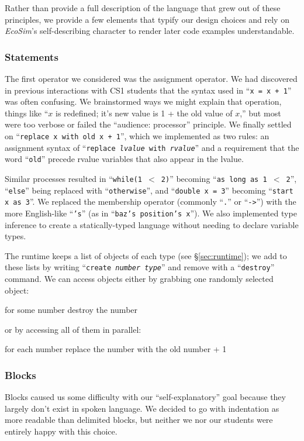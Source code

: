 \documentclass{sig-alternate}
\newcommand{\INDSTATE}[1][1]{\STATE\hspace{#1\algorithmicindent}}
\newcommand{\EcoSim}{\emph{EcoSim}}
\newenvironment{snippet}{\begin{algorithmic}\ttfamily\lsstyle}{\end{algorithmic}}
\newcommand{\code}[1]{``\texttt{\lsstyle#1}''}
\newcommand{\clike}[1]{``\texttt{\lsstyle#1}''}
\begin{document}
Rather than provide a full description of the language that grew out of these principles,
we provide a few elements that typify our design choices
and rely on {\EcoSim}'s self-describing character 
to render later code examples understandable.

\vspace{0.2in}
\subsubsection{Statements}
The first operator we considered was the assignment operator.
We had discovered in previous interactions with CS1 students
that the syntax used in \clike{x = x + 1} was often confusing.
We brainstormed ways we might explain that operation,
things like ``$x$ is redefined; it's new value is 1 + the old value of $x$,''
but most were too verbose or failed the ``audience: processor'' principle.
We finally settled on \code{replace x with old x + 1},
which we implemented as two rules:
an assignment syntax of \code{replace {\it lvalue} with {\it rvalue}}
and a requirement that the word \code{old} precede rvalue variables that also appear in the lvalue.

Similar processes resulted in 
\code{while(1 $<$ 2)} becoming \code{as long as 1 $<$ 2},
\clike{else} being replaced with \code{otherwise}, 
and \clike{double x = 3} becoming \code{start x as 3}.
We replaced the membership operator (commonly \clike{.} or \mbox{\clike{->}})
with the more English-like \code{'s} (as in \code{baz's position's x}).
We also implemented type inference to create a statically-typed language 
without needing to declare variable types.

The runtime keeps a list of objects of each type (see \S\ref{sec:runtime});
we add to these lists by writing \code{create {\it number} {\it type}} and remove with a \code{destroy} command.
We can access objects either by grabbing one randomly selected object:
\begin{snippet}
\STATE for some number
\INDSTATE destroy the number
\end{snippet}
or by accessing all of them in parallel:
\begin{snippet}
\STATE for each number
\INDSTATE replace the number with the old number + 1
\end{snippet}

\subsubsection{Blocks}
Blocks caused us some difficulty with our ``self-explanatory'' goal because they largely don't exist in spoken language.
We decided to go with indentation as more readable than delimited blocks, but neither we nor our students were entirely happy with this choice.
\end{document}
